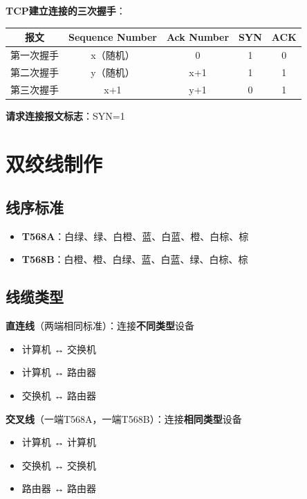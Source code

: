 \documentclass[12pt,a4paper]{ctexart}
\begin{document}
\begin{keybox}
\textbf{TCP建立连接的三次握手}：

\begin{center}
\begin{tabular}{|c|c|c|c|c|}
\hline
\textbf{报文} & \textbf{Sequence Number} & \textbf{Ack Number} & \textbf{SYN} & \textbf{ACK} \\
\hline
第一次握手 & x（随机） & 0 & 1 & 0 \\
\hline
第二次握手 & y（随机） & x+1 & 1 & 1 \\
\hline
第三次握手 & x+1 & y+1 & 0 & 1 \\
\hline
\end{tabular}
\end{center}

\textbf{请求连接报文标志}：SYN=1
\end{keybox}

\section{双绞线制作}

\subsection{线序标准}

\begin{itemize}[leftmargin=2em,itemsep=0pt]
    \item \textbf{T568A}：白绿、绿、白橙、蓝、白蓝、橙、白棕、棕
    \item \textbf{T568B}：白橙、橙、白绿、蓝、白蓝、绿、白棕、棕
\end{itemize}

\subsection{线缆类型}

\begin{keybox}
\textbf{直连线}（两端相同标准）：连接\textbf{不同类型}设备
\begin{itemize}[itemsep=0pt]
    \item 计算机 ↔ 交换机
    \item 计算机 ↔ 路由器
    \item 交换机 ↔ 路由器
\end{itemize}

\textbf{交叉线}（一端T568A，一端T568B）：连接\textbf{相同类型}设备
\begin{itemize}[itemsep=0pt]
    \item 计算机 ↔ 计算机
    \item 交换机 ↔ 交换机
    \item 路由器 ↔ 路由器
\end{itemize}
\end{keybox}
\end{document}
